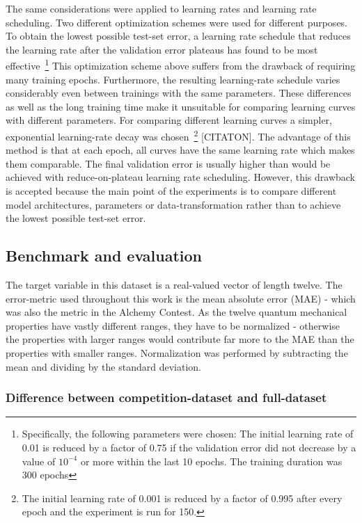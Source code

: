 The same considerations were applied to learning rates and learning rate scheduling. Two different optimization schemes were used for different purposes.
To obtain the lowest possible test-set error, a learning rate schedule that reduces the learning rate after the validation error plateaus has found to be most effective~\footnote{Specifically, the following parameters were chosen: The initial learning rate of 0.01 is reduced by a factor of 0.75 if the validation error did not decrease by a value of $10^{-4}$ or more within the last 10 epochs. The training duration was 300 epochs} This optimization scheme above suffers from the drawback of requiring many training epochs. Furthermore, the resulting learning-rate schedule varies considerably even between trainings with the same parameters. These differences as well as the long training time make it unsuitable for comparing learning curves with different parameters.
For comparing different learning curves a simpler, exponential learning-rate decay was chosen~\footnote{The initial learning rate of 0.001 is reduced by a factor of 0.995 after every epoch and the experiment is run for 150.} [CITATON]. The advantage of this method is that at each epoch, all curves have the same learning rate which makes them comparable. The final validation error is usually higher than would be achieved with reduce-on-plateau learning rate scheduling. However, this drawback is accepted because the main point of the experiments is to compare different model architectures, parameters or data-transformation rather than to achieve the lowest possible test-set error.


\subsection{Benchmark and evaluation}

The target variable in this dataset is a real-valued vector of length twelve. The error-metric used throughout this work is the mean absolute error (MAE) - which was also the metric in the Alchemy Contest. As the twelve quantum mechanical properties have vastly different ranges, they have to be normalized - otherwise the properties with larger ranges would contribute far more to the MAE than the properties with smaller ranges. Normalization was performed by subtracting the mean and dividing by the standard deviation.

\subsubsection{Difference between competition-dataset and full-dataset}


